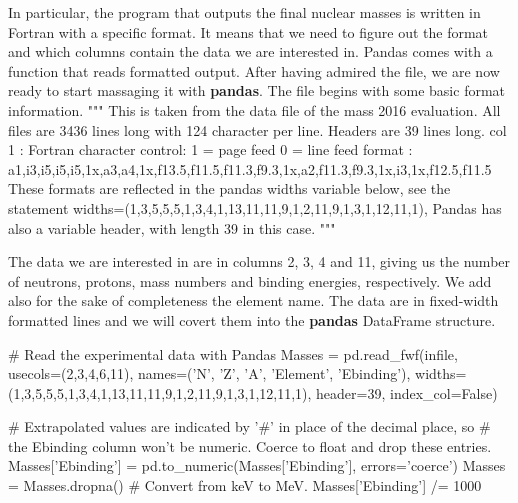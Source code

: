 \documentclass[%
oneside,                 %
final,                   %
10pt]{article}
\begin{document}
In particular, the program that outputs the final nuclear masses is written in Fortran with a specific format. It means that we need to figure out the format and which columns contain the data we are interested in. Pandas comes with a function that reads formatted output. After having admired the file, we are now ready to start massaging it with \textbf{pandas}. The file begins with some basic format information.
\bpycod
"""                                                                                                                         
This is taken from the data file of the mass 2016 evaluation.                                                               
All files are 3436 lines long with 124 character per line.                                                                  
       Headers are 39 lines long.                                                                                           
   col 1     :  Fortran character control: 1 = page feed  0 = line feed                                                     
   format    :  a1,i3,i5,i5,i5,1x,a3,a4,1x,f13.5,f11.5,f11.3,f9.3,1x,a2,f11.3,f9.3,1x,i3,1x,f12.5,f11.5                     
   These formats are reflected in the pandas widths variable below, see the statement                                       
   widths=(1,3,5,5,5,1,3,4,1,13,11,11,9,1,2,11,9,1,3,1,12,11,1),                                                            
   Pandas has also a variable header, with length 39 in this case.                                                          
"""
\epycod

The data we are interested in are in columns 2, 3, 4 and 11, giving us
the number of neutrons, protons, mass numbers and binding energies,
respectively. We add also for the sake of completeness the element name. The data are in fixed-width formatted lines and we will
covert them into the \textbf{pandas} DataFrame structure.

\bpycod
# Read the experimental data with Pandas
Masses = pd.read_fwf(infile, usecols=(2,3,4,6,11),
              names=('N', 'Z', 'A', 'Element', 'Ebinding'),
              widths=(1,3,5,5,5,1,3,4,1,13,11,11,9,1,2,11,9,1,3,1,12,11,1),
              header=39,
              index_col=False)

# Extrapolated values are indicated by '#' in place of the decimal place, so
# the Ebinding column won't be numeric. Coerce to float and drop these entries.
Masses['Ebinding'] = pd.to_numeric(Masses['Ebinding'], errors='coerce')
Masses = Masses.dropna()
# Convert from keV to MeV.
Masses['Ebinding'] /= 1000
\end{document}
